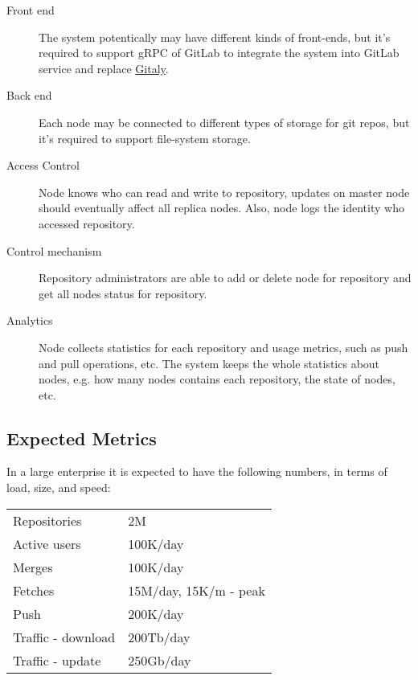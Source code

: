 \documentclass[12pt,oneside]{article}
\begin{document}
\begin{description}
  \item[Front end]
    The system potentically may have different kinds of front-ends,
    but it's required to support gRPC of GitLab to integrate the system
    into GitLab service and replace \href{https://docs.gitlab.com/ee/administration/gitaly/}{Gitaly}.
  \item[Back end]
    Each node may be connected to different types of storage for git repos,
    but it's required to support file-system storage.
  \item[Access Control]
    Node knows who can read and write to repository,
    updates on master node should eventually affect all replica nodes.
    Also, node logs the identity who accessed repository.
  \item[Control mechanism]
    Repository administrators are able to add or delete node for repository and
    get all nodes status for repository.
  \item[Analytics]
    Node collects statistics for each repository and usage metrics, such as
    push and pull operations, etc. The system keeps the whole statistics about
    nodes, e.g. how many nodes contains each repository, the state of nodes, etc.
\end{description}

\subsection{Expected Metrics}
\label{ref:metrics}

In a large enterprise it is expected to have the following
numbers, in terms of load, size, and speed:

\begin{tabular}{ll}
  Repositories & 2M \\
  Active users & 100K/day \\
  Merges & 100K/day \\
  Fetches & 15M/day, 15K/m - peak \\
  Push & 200K/day \\
  Traffic - download & 200Tb/day \\
  Traffic - update & 250Gb/day \\
\end{tabular}

\printbibliography%
\end{document}
